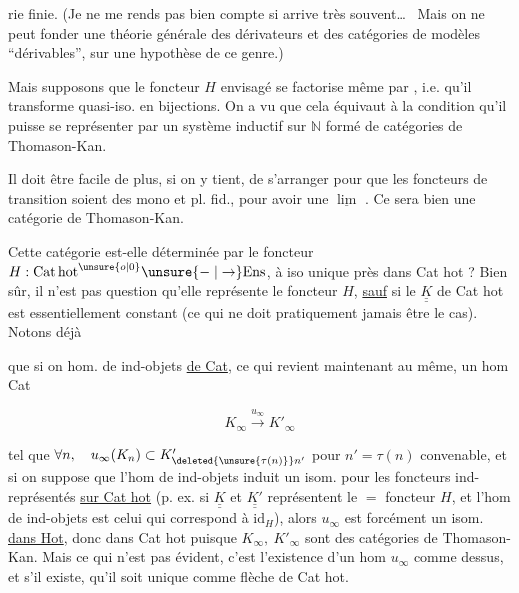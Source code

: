 
rie finie. (Je ne me rends pas bien compte si  arrive très souvent\ldots\ \deleted{\unsure{)}} Mais on ne peut fonder une théorie générale des dérivateurs et des catégories de modèles ``dérivables'', sur une hypothèse de ce genre.)

Mais supposons que le foncteur $H$ envisagé se factorise même par , i.e. qu'il transforme quasi-iso. en bijections. On a vu que cela équivaut à la condition qu'il puisse se représenter par un système inductif sur $\mathbb N$ formé de catégories de Thomason-Kan.

Il doit être facile de plus, si on y tient, de s'arranger pour que les foncteurs de transition soient des mono et pl. fid., pour avoir une $\underline{\lim}$ . Ce sera bien  une catégorie de Thomason-Kan.

Cette catégorie est-elle déterminée par le foncteur $H:\mathrm{Cat\,hot}^{\unsure{o|0}}\unsure{\relbar|\to}\mathrm{Ens}$, à iso unique près  dans Cat hot ? Bien sûr, il n'est pas question qu'elle représente le foncteur $H$, \uline{sauf} si  le   $\underline{\underline K}$ de Cat hot est essentiellement constant (ce qui ne doit pratiquement jamais être le cas). Notons déjà


que si on  hom. de ind-objets \uline{de Cat},  ce qui revient maintenant au même, un hom  Cat

\[
K_\infty \xrightarrow{u_\infty} K'_\infty
\]

tel que $\forall n,\quad u_\infty(K_n)\subset K'_{\deleted{\unsure{\tau(n)}}n'}$ pour $n'=\tau(n)$ convenable,  et si on suppose que l'hom de ind-objets induit un isom. pour les foncteurs ind-représentés \uline{sur Cat hot} (p. ex. si $\underline{\underline K}$ et $\underline{\underline {K'}}$ représentent le $=$ foncteur $H$, et l'hom de ind-objets est celui qui correspond à $\mathrm{id}_H$), alors $u_\infty$ est forcément un isom. \uline{dans Hot}, donc   dans Cat hot puisque $K_\infty,\ K'_\infty$ sont des catégories de Thomason-Kan. Mais ce qui n'est pas évident, c'est l'existence d'un hom $u_\infty$ comme dessus, et s'il existe, qu'il soit unique  comme flèche de Cat hot.

